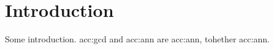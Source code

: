 \chapter{Introduction}

Some introduction. \acrshort{acc:gcd} and \acrshort{acc:ann} are \acrlong{acc:ann}, tohether \acrfull{acc:ann}.
